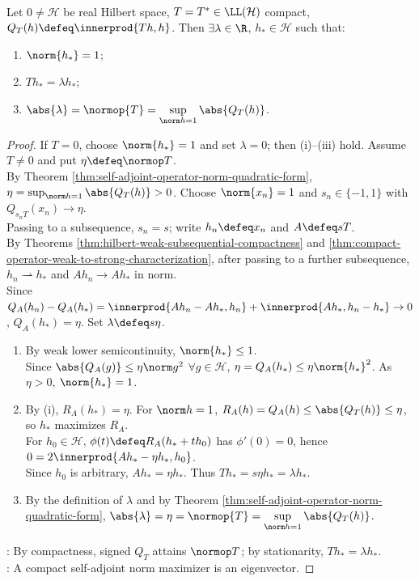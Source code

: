 \begin{lemma} \label{lem:hilbert-schmidt-compact-self-adjoint-eigenvalue} \\
Let $0\neq\mathcal H$ be real Hilbert space, $T=T^*\in\LL(\mathcal H)$ compact, $Q_T(h)\defeq\innerprod{Th,h}$. Then $\exists\lambda\in\R$, $h_*\in\mathcal H$ such that:
\begin{enumerate}[label=(\roman*)]
\setlength{\itemsep}{0pt}
\item $\norm{h_*}=1$;
\item $Th_*=\lambda h_*$;
\item $\abs{\lambda}=\normop{T}=\sup\limits_{\norm h=1}\abs{Q_T(h)}$.
\end{enumerate}
\begin{proof} If $T=0$, choose $\norm{h_*}=1$ and set $\lambda=0$; then (i)--(iii) hold. Assume $T\neq0$ and put $\eta\defeq\normop T$.\\
By Theorem \ref{thm:self-adjoint-operator-norm-quadratic-form}, $\eta=\sup_{\norm h=1}\abs{Q_T(h)}>0$. Choose $\norm{x_n}=1$ and $s_n\in\{-1,1\}$ with $Q_{s_nT}(x_n)\to\eta$.\\
Passing to a subsequence, $s_n=s$; write $h_n\defeq x_n$ and $A\defeq sT$.\\
By Theorems \ref{thm:hilbert-weak-subsequential-compactness} and \ref{thm:compact-operator-weak-to-strong-characterization}, after passing to a further subsequence, $h_n\rightharpoonup h_*$ and $Ah_n\to Ah_*$ in norm.\\
Since $Q_A(h_n)-Q_A(h_*)=\innerprod{Ah_n-Ah_*,h_n}+\innerprod{Ah_*,h_n-h_*}\to0$, $Q_A(h_*)=\eta$. Set $\lambda\defeq s\eta$.
\begin{enumerate}[label=(\roman*)]
\setlength{\itemsep}{0pt}
\item By weak lower semicontinuity, $\norm{h_*}\leq1$.\\
Since $\abs{Q_A(g)}\leq\eta\norm g^2$ $\forall g\in\mathcal H$, $\eta=Q_A(h_*)\leq\eta\norm{h_*}^2$. As $\eta>0$, $\norm{h_*}=1$.
\item By (i), $R_A(h_*)=\eta$. For $\norm h=1$, $R_A(h)=Q_A(h)\leq\abs{Q_T(h)}\leq\eta$, so $h_*$ maximizes $R_A$.\\
For $h_0\in\mathcal H$, $\phi(t)\defeq R_A(h_*+t h_0)$ has $\phi'(0)=0$, hence $0=2\innerprod{Ah_*-\eta h_*,h_0}$.\\
Since $h_0$ is arbitrary, $Ah_*=\eta h_*$. Thus $Th_*=s\eta h_*=\lambda h_*$.
\item By the definition of $\lambda$ and by Theorem \ref{thm:self-adjoint-operator-norm-quadratic-form}, $\abs{\lambda}=\eta=\normop{T}=\sup\limits_{\norm h=1}\abs{Q_T(h)}$.
\end{enumerate}
: By compactness, signed $Q_T$ attains $\normop T$; by stationarity, $Th_*=\lambda h_*$.\\
: A compact self-adjoint norm maximizer is an eigenvector.
\end{proof}
\end{lemma}


